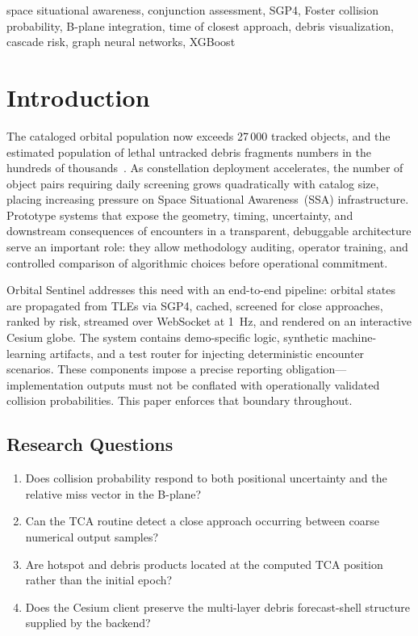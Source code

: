 \documentclass[conference]{IEEEtran}
\begin{document}
\begin{IEEEkeywords}
space situational awareness, conjunction assessment, SGP4, Foster collision
probability, B-plane integration, time of closest approach, debris visualization,
cascade risk, graph neural networks, XGBoost
\end{IEEEkeywords}

\section{Introduction}
\label{sec:intro}

The cataloged orbital population now exceeds 27\,000 tracked objects, and the
estimated population of lethal untracked debris fragments numbers in the hundreds
of thousands~\cite{esa2024}. As constellation deployment accelerates, the number
of object pairs requiring daily screening grows quadratically with catalog size,
placing increasing pressure on Space Situational Awareness~(SSA) infrastructure.
Prototype systems that expose the geometry, timing, uncertainty, and downstream
consequences of encounters in a transparent, debuggable architecture serve an
important role: they allow methodology auditing, operator training, and controlled
comparison of algorithmic choices before operational commitment.

Orbital Sentinel addresses this need with an end-to-end pipeline: orbital states
are propagated from TLEs via SGP4, cached, screened for close approaches, ranked
by risk, streamed over WebSocket at 1~Hz, and rendered on an interactive Cesium
globe. The system contains demo-specific logic, synthetic machine-learning
artifacts, and a test router for injecting deterministic encounter scenarios.
These components impose a precise reporting obligation---implementation outputs
must not be conflated with operationally validated collision probabilities. This
paper enforces that boundary throughout.

\subsection*{Research Questions}
\begin{enumerate}
  \item Does collision probability respond to both positional uncertainty and the
        relative miss vector in the B-plane?
  \item Can the TCA routine detect a close approach occurring between coarse
        numerical output samples?
  \item Are hotspot and debris products located at the computed TCA position
        rather than the initial epoch?
  \item Does the Cesium client preserve the multi-layer debris forecast-shell
        structure supplied by the backend?
\end{enumerate}
\end{document}
